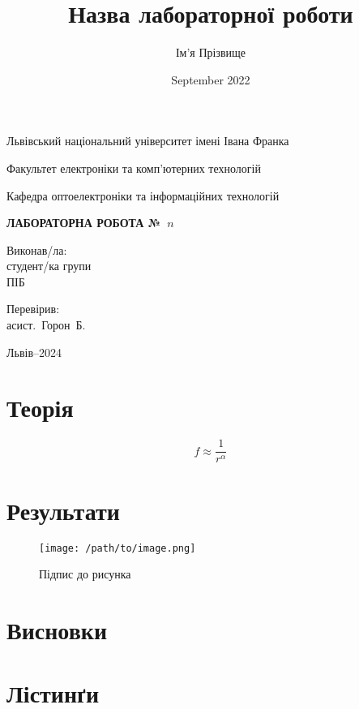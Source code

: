 \documentclass[a4paper, 14pt]{article}
\title{Назва лабораторної роботи}
\author{Ім'я Прізвище}
\date{September 2022}
\makeatletter
\let\inserttitle\@title
\makeatother
\begin{document}
\begin{titlepage}
   \centerline{\small{Львівський національний університет імені Івана Франка}}
   \centerline{\small{Факультет електроніки та комп'ютерних технологій}}
   \centerline{\small{Кафедра оптоелектроніки та інформаційних технологій}}
   \vskip70mm
   \centerline{\textbf{\Large{ЛАБОРАТОРНА РОБОТА №~$n$}}}
   \vskip20mm
   \centerline{\Large{\inserttitle}}
   \vskip20mm
   \hfill
   \begin{minipage}{0.3\textwidth}
       Виконав/ла: \\
       студент/ка групи \\
       ПІБ
   \end{minipage}
   \vskip10mm
   \hfill
   \begin{minipage}{0.3\textwidth}
       Перевірив: \\
       асист.~Горон~Б.
   \end{minipage}
   \vfill
   \centerline{Львів--2024}
\end{titlepage}


\section*{Теорія}

\begin{equation}
	f \approx \frac{1}{r^{\alpha}}
\end{equation}

\section*{Результати}

\begin{figure}[!htbp]
	\centering
	\texttt{[image: /path/to/image.png]}
	\caption{Підпис до рисунка}
	\label{fig:enter-label}
\end{figure}

\section*{Висновки}

\appendix

\section*{Лістинґи}
\end{document}
